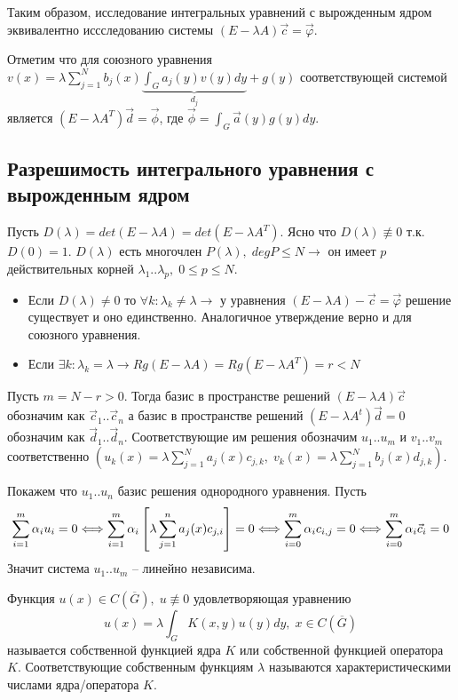 Таким образом, исследование интегральных уравнений с вырожденным ядром эквивалентно иссследованию системы $(E -\lambda A)\vec{c} = \vec{\varphi}$.

\begin{offtop}
Отметим что для союзного уравнения $v(x) = \lambda \sum_{j = 1}^{N}b_{j}(x)\underbrace{\int_{G}a_{j}(y)v(y)dy}_{d_{j}} + g(y)$ соответствующей системой является $(E - \lambda A^{T})\vec{d}=\vec{\phi}$, где $\vec{\phi}=\int_{G}\vec{a}(y)g(y)dy$.
\end{offtop}

\subsection{Разрешимость интегрального уравнения с вырожденным ядром}
Пусть $D(\lambda) = det(E - \lambda A) = det(E - \lambda A^{T})$. Ясно что $D(\lambda) \not\equiv 0$ т.к. $D(0) = 1$. $D(\lambda)$ есть многочлен $P(\lambda), \; degP \leq N \longrightarrow$ он имеет $p$ действительных корней $\lambda_{1}..\lambda_{p},\; 0 \leq p \leq N$.
\begin{itemize}
  \item Если $D(\lambda) \neq 0$ то $\forall k: \lambda_{k} \neq \lambda \longrightarrow$ у уравнения $(E - \lambda A)-\vec{c} = \vec{\varphi}$ решение существует и оно единственно. Аналогичное утверждение верно и для союзного уравнения.
  \item Если $\exists k: \lambda_{k} = \lambda \rightarrow Rg(E - \lambda A) = Rg(E - \lambda A^{T}) = r < N$
\end{itemize}

Пусть $m = N - r > 0$. Тогда базис в пространстве решений $(E - \lambda A)\vec{c}$ обозначим как $\vec{c}_{1}..\vec{c}_{n}$ а базис в пространстве решений $(E - \lambda A^{t})\vec{d}=0$ обозначим как $\vec{d}_{1}..\vec{d}_{n}$. Соответствующие им решения обозначим $u_{1}..u_{m}$ и $v_{1}..v_{m}$ соответственно $(u_{k}(x) = \lambda \sum_{j = 1}^{N}a_{j}(x)c_{j,k}, \; v_{k}(x) = \lambda \sum_{j = 1}^{N}b_{j}(x)d_{j,k})$.

Покажем что $u_{1}..u_{n}$ базис решения однородного уравнения. Пусть
$$\sum_{i=1}^{m}\alpha_{i}u_{i} = 0 \Longleftrightarrow \sum_{i=1}^{m}\alpha_{i}\left[\lambda\sum_{j=1}^{n}a_{j}(x)c_{j,i}\right] = 0 \Longleftrightarrow \sum_{i=0}^{m}\alpha_{i}c_{i,j} = 0 \Longleftrightarrow \sum_{i=0}^{m}\alpha_{i}\vec{c}_{i} = 0$$
Значит система $u_{1}..u_{m}$ -- линейно независима.

\begin{definition}
Функция $u(x) \in C(\overline{G}), \; u \not\equiv 0$ удовлетворяющая уравнению
$$u(x) = \lambda \int_{G}K(x,y)u(y)dy, \; x \in C(\overline{G})$$
называется собственной функцией ядра $K$ или собственной функцией оператора $K$. Соответствующие собственным функциям $\lambda$ называются характеристическими числами ядра/оператора $K$.
\end{definition}

